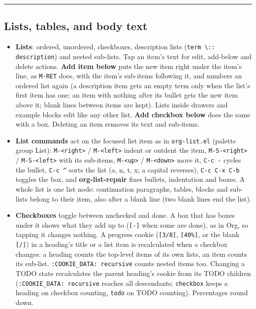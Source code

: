 \documentclass[11pt]{article}
\begin{document}
\noindent\rule{\textwidth}{0.5pt}

\subsection{Lists, tables, and body text}
\label{sec:orgca29dff}
\begin{itemize}
\item \textbf{Lists}: ordered, unordered, checkboxes, description lists (\texttt{term \textbackslash{}:: description}) and nested sub-lists. Tap an item's text for edit, add-below and delete actions. \textbf{Add item below} puts the new item right under the item's line, as \texttt{M-RET} does, with the item's sub-items following it, and numbers an ordered list again (a description item gets an empty term only when the list's first item has one; an item with nothing after its bullet gets the new item above it; blank lines between items are kept). Lists inside drawers and example blocks edit like any other list. \textbf{Add checkbox below} does the same with a box. Deleting an item removes its text and sub-items.
\item \textbf{List commands} act on the focused list item as in \texttt{org-list.el} (palette group List): \texttt{M-<right>} / \texttt{M-<left>} indent or outdent the item, \texttt{M-S-<right>} / \texttt{M-S-<left>} with its sub-items, \texttt{M-<up>} / \texttt{M-<down>} move it, \texttt{C-c -} cycles the bullet, \texttt{C-c \textasciicircum{}} sorts the list (a, n, t, x; a capital reverses), \texttt{C-c C-x C-b} toggles the box, and \textbf{org-list-repair} fixes bullets, indentation and boxes. A whole list is one list node: continuation paragraphs, tables, blocks and sub-lists belong to their item, also after a blank line (two blank lines end the list).
\item \textbf{Checkboxes} toggle between unchecked and done. A box that has boxes under it shows what they add up to (\texttt{[-]} when some are done), as in Org, so tapping it changes nothing. A progress cookie (\texttt{[3/8]}, \texttt{[40\%]}, or the blank \texttt{[/]}) in a heading's title or a list item is recalculated when a checkbox changes: a heading counts the top-level items of its own lists, an item counts its sub-list. \texttt{:COOKIE\_DATA: recursive} counts nested items too. Changing a TODO state recalculates the parent heading's cookie from its TODO children (\texttt{:COOKIE\_DATA: recursive} reaches all descendants; \texttt{checkbox} keeps a heading on checkbox counting, \texttt{todo} on TODO counting). Percentages round down.

\end{itemize}
\end{document}

